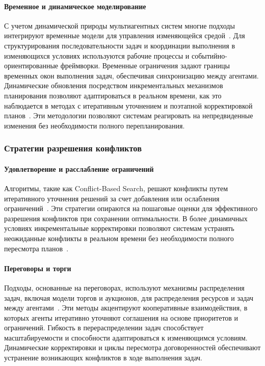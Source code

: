 \paragraph{Временное и динамическое моделирование}

С учетом динамической природы мультиагентных систем многие подходы интегрируют временные модели
для управления изменяющейся средой~\cite{MA2021103823,LU2014215}.
Для структурирования последовательности задач и координации выполнения
в изменяющихся условиях используются рабочие процессы и событийно-ориентированные фреймворки.
Временные ограничения задают границы временных окон выполнения задач,
обеспечивая синхронизацию между агентами.
Динамические обновления посредством инкрементальных механизмов планирования позволяют адаптироваться в реальном времени,
как это наблюдается в методах с итеративным уточнением и поэтапной корректировкой планов~\cite{SEMIZ2021220}.
Эти методологии позволяют системам реагировать на непредвиденные изменения без необходимости полного перепланирования.

\subsubsection{Стратегии разрешения конфликтов}

\paragraph{Удовлетворение и расслабление ограничений}

Алгоритмы, такие как Conflict-Based Search,
решают конфликты путем итеративного уточнения решений
за счет добавления или ослабления ограничений~\cite{SHARON201540}.
Эти стратегии опираются на пошаговые оценки для эффективного разрешения конфликтов при сохранении оптимальности.
В более динамичных условиях инкрементальные корректировки позволяют системам
устранять неожиданные конфликты в реальном времени без необходимости полного пересмотра планов~\cite{KOMENDA201476}.

\paragraph{Переговоры и торги}

Подходы, основанные на переговорах, используют механизмы распределения задач,
включая модели торгов и аукционов,
для распределения ресурсов и задач между агентами~\cite{GHARRAD2021108282,FRANKOVIC20017,RABELO1994303}.
Эти методы акцентируют кооперативные взаимодействия,
в которых агенты итеративно уточняют соглашения на основе приоритетов и ограничений.
Гибкость в перераспределении задач способствует масштабируемости и способности адаптироваться к изменяющимся условиям.
Динамические корректировки и циклы пересмотра договоренностей обеспечивают устранение возникающих конфликтов в ходе выполнения задач.


